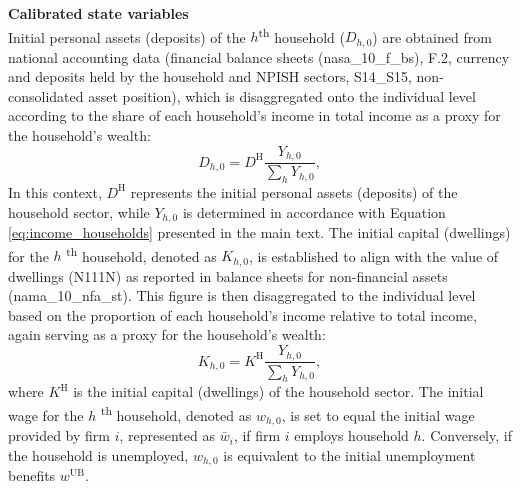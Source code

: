 \textbf{Calibrated state variables}\\

\noindent  Initial personal assets (deposits) of the $h$\textsuperscript{th} household ($D_{h,0}$) are obtained from national accounting data (financial balance sheets (nasa{\_}10{\_}f{\_}bs), F.2, currency and deposits held by the household and NPISH sectors, S14\_S15, non-consolidated asset position), which is disaggregated onto the individual level according to the share of each household's income in total income as a proxy for the household's wealth: 
\begin{equation*} 
	D_{h,0}=D^{\mathrm{H}}\frac{Y_{h,0}}{\sum_{h} Y_{h,0}}
,\end{equation*}
\noindent  In this context, \(D^{\mathrm{H}}\) represents the initial personal assets (deposits) of the household sector, while \(Y_{h,0}\) is determined in accordance with Equation \eqref{eq:income_households} presented in the main text. The initial capital (dwellings) for the \(h\) \textsuperscript{th} household, denoted as \(K_{h,0}\), is established to align with the value of dwellings (N111N) as reported in balance sheets for non-financial assets (nama{\_}10{\_}nfa{\_}st). This figure is then disaggregated to the individual level based on the proportion of each household's income relative to total income, again serving as a proxy for the household's wealth:
\begin{equation*} 
	K_{h,0}=K^{\mathrm{H}}\frac{Y_{h,0}}{\sum_{h} Y_{h,0}},
\end{equation*}
where $K^{\mathrm{H}}$ is the initial capital (dwellings) of the household sector. The initial wage for the \(h\) \textsuperscript{th} household, denoted as \(w_{h,0}\), is set to equal the initial wage provided by firm \(i\), represented as \(\bar{w}_{i}\), if firm \(i\) employs household \(h\). Conversely, if the household is unemployed, \(w_{h,0}\) is equivalent to the initial unemployment benefits \(w^{\mathrm{UB}}\). \\

